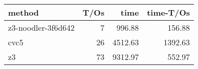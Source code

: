 \begin{tabular}{lrrr}
\hline
 method             &   T/Os &    time &   time-T/Os \\
\hline
 z3-noodler-3f6d642 &      7 &  996.88 &      156.88 \\
 cvc5               &     26 & 4512.63 &     1392.63 \\
 z3                 &     73 & 9312.97 &      552.97 \\
\hline
\end{tabular}
